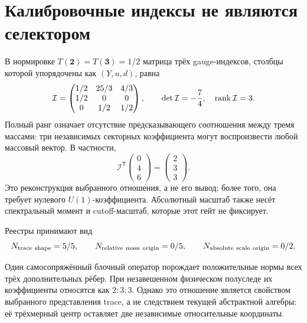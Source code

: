 \section{Калибровочные индексы не являются селектором}

В нормировке $T(\mathbf2)=T(\mathbf3)=1/2$ матрица трёх gauge-индексов,
столбцы которой упорядочены как $(Y,u,d)$, равна
\begin{equation}
 \mathcal I=
 \begin{pmatrix}
 1/2&25/3&4/3\\
 1/2&0&0\\
 0&1/2&1/2
 \end{pmatrix},
 \qquad
 \det\mathcal I=-\frac74,\quad \operatorname{rank}\mathcal I=3.
 \label{eq:v8-extra-edge-mass-gauge-index-matrix}
\end{equation}
Полный ранг означает отсутствие предсказывающего соотношения между тремя
массами: три независимых секторных коэффициента могут воспроизвести любой
массовый вектор. В частности,
\begin{equation}
 \mathcal I^{\mathsf T}
 \begin{pmatrix}0\\4\\6\end{pmatrix}
 =\begin{pmatrix}2\\3\\3\end{pmatrix}.
 \label{eq:v8-extra-edge-mass-gauge-reconstruction}
\end{equation}
Это реконструкция выбранного отношения, а не его вывод; более того, она
требует нулевого $U(1)$-коэффициента. Абсолютный масштаб также несёт
спектральный момент и cutoff-масштаб, которые этот гейт не фиксирует.

Реестры принимают вид
\begin{equation}
 N_{\rm trace\ shape}=5/5,\qquad
 N_{\rm relative\ mass\ origin}=0/5,\qquad
 N_{\rm absolute\ scale\ origin}=0/2.
 \label{eq:v8-extra-edge-mass-ledgers}
\end{equation}

\begin{theorem}
Один самосопряжённый блочный оператор порождает положительные нормы всех
трёх дополнительных рёбер. При незавешенном физическом полуследе их
коэффициенты относятся как $2:3:3$. Однако это отношение является свойством
выбранного представления trace, а не следствием текущей абстрактной
алгебры: её трёхмерный центр оставляет две независимые относительные
координаты.
\end{theorem}

